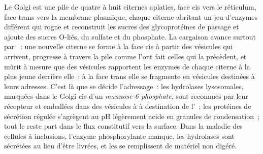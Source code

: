\begin{proposition}[Le Golgi]\label{prop:b3:membrane-traffic:golgi}
Le Golgi est une pile de quatre à huit citernes aplaties, face cis vers
le réticulum, face trans vers la membrane plasmique, chaque citerne
abritant un jeu d'enzymes différent qui rogne et reconstruit les sucres
des glycoprotéines de passage et ajoute des sucres O-liés, du sulfate
et du phosphate. La cargaison avance surtout par \emph{}~: une nouvelle citerne se forme à la face cis à partir des
vésicules qui arrivent, progresse à travers la pile comme l'ont fait
celles qui la précèdent, et mûrit à mesure que des vésicules 
rapportent les enzymes de chaque citerne à la plus jeune derrière
elle~; à la face trans elle se fragmente en vésicules destinées à leurs
adresses. C'est là que se décide l'adressage~: les hydrolases
lysosomales, marquées dans le Golgi cis d'un
\emph{mannose-6-phosphate}, sont reconnues par leur récepteur et
emballées dans des vésicules à  à destination de l'~;
les protéines de sécrétion régulée s'agrègent au pH légèrement acide en
granules de condensation~; tout le reste part dans le flux constitutif
vers la surface. Dans la maladie des cellules à inclusions, l'enzyme
phosphorylante manque, les hydrolases sont sécrétées au lieu d'être
livrées, et les  se remplissent de matériel non digéré.
\end{proposition}

